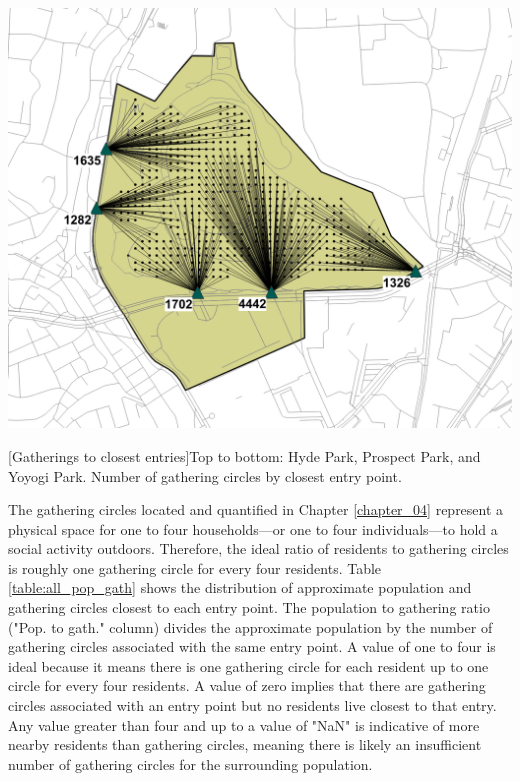 \begin{multicols}{2}
\begin{minipage}{0.45\textwidth}
    \includegraphics[width=\linewidth]{images/network/yoyogi_gatherings_nearest.png}\par\hspace{3pt}
    \par{}[Gatherings to closest entries]{Top to bottom: Hyde Park, Prospect Park, and Yoyogi Park. Number of gathering circles by closest entry point.}
    \label{fig:nearest_gatherings}
\end{minipage}

The gathering circles located and quantified in Chapter \ref{chapter_04} represent a physical space for one to four households---or one to four individuals---to hold a social activity outdoors. Therefore, the ideal ratio of residents to gathering circles is roughly one gathering circle for every four residents. Table \ref{table:all_pop_gath} shows the distribution of approximate population and gathering circles closest to each entry point. The population to gathering ratio ("Pop. to gath." column) divides the approximate population by the number of gathering circles associated with the same entry point. A value of one to four is ideal because it means there is one gathering circle for each resident up to one circle for every four residents. A value of zero implies that there are gathering circles associated with an entry point but no residents live closest to that entry. Any value greater than four and up to a value of "NaN" is indicative of more nearby residents than gathering circles, meaning there is likely an insufficient number of gathering circles for the surrounding population.


\end{multicols}
